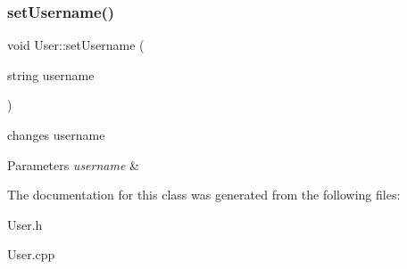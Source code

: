\subsubsection{\texorpdfstring{set\+Username()}{setUsername()}}
{\footnotesize\ttfamily void User\+::set\+Username (\begin{DoxyParamCaption}\item[{string}]{username }\end{DoxyParamCaption})\hspace{0.3cm}{\ttfamily [inline]}}



changes username 


\begin{DoxyParams}{Parameters}
{\em username} & \\
\hline
\end{DoxyParams}


The documentation for this class was generated from the following files\+:\begin{DoxyCompactItemize}
\item 
User.\+h\item 
User.\+cpp\end{DoxyCompactItemize}
